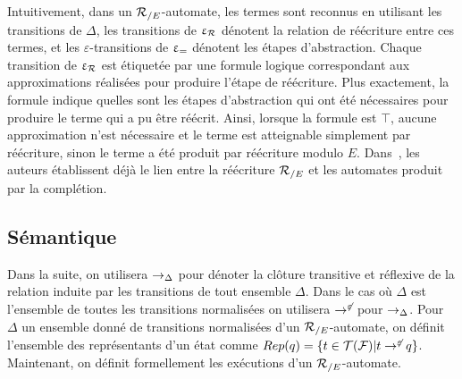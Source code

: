 Intuitivement, dans un ${\mathcal R_{/E}}$-automate, les termes sont reconnus en utilisant les transitions de $\Delta$, les transitions de $\upvarepsilon_{\mathcal R}$ dénotent la relation de réécriture
entre ces termes, et les $\varepsilon$-transitions de $\upvarepsilon_{=}$ dénotent
les étapes d'abstraction. Chaque transition de $\upvarepsilon_{\mathcal R}$ est étiquetée par une formule logique
correspondant aux approximations réalisées pour produire l'étape de réécriture. 
Plus exactement, la formule indique quelles sont les étapes d'abstraction qui ont été nécessaires 
pour produire le terme qui a pu être réécrit. 
Ainsi, lorsque la formule est $\top$, aucune approximation n'est nécessaire et le terme
est atteignable simplement par réécriture, sinon le terme a été produit par réécriture 
modulo $E$. Dans~\cite{GenetR-JSC10}, les auteurs établissent déjà le lien entre la réécriture ${\mathcal R_{/E}}$
et les automates produit par la complétion.




\subsection{Sémantique}







Dans la suite, on utilisera $\rightarrow_\Delta$ pour dénoter la clôture transitive et réflexive de 
la relation induite par les transitions de tout ensemble $\Delta$. 
Dans le cas où $\Delta$ est l'ensemble de toutes les transitions normalisées on utilisera $\rightarrow^{\not\varepsilon}$ 
pour $\rightarrow_\Delta$. 
Pour $\Delta$ un ensemble donné de transitions normalisées d'un ${\mathcal R_{/E}}$-automate, 
on définit l'ensemble des représentants d'un état comme $Rep(q) = \{ t \in \mathcal{T(F)} | t \rightarrow^{\not\varepsilon} q\}$. 
Maintenant, on définit formellement les exécutions d'un ${\mathcal R_{/E}}$-automate.

